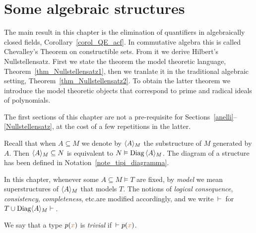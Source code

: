 \chapter{Some algebraic structures}
\label{algebraic}

\def\medrel#1{\parbox[b]{6ex}{\hfil$#1$}}
\def\ceq#1#2#3{\parbox[b]{25ex}{$\displaystyle #1$}\medrel{#2}$\displaystyle #3$}

The main result in this chapter is the elimination of quantifiers in algebraically closed fields, Corollary~\ref{corol_QE_acf}.
In commutative algebra this is called Chevalley's Theorem on constructible sets.
%
From it we derive Hilbert's Nullstellensatz.
First we state the theorem the model theoretic language, Theorem~\ref{thm_Nullstellensatz1}, then we tranlate it in the traditional algebraic setting, Theorem~\ref{thm_Nullstellensatz2}.
%
To obtain the latter theorem we introduce the model theoretic objects that correspond to prime and radical ideals of polynomials.


The first sections of this chapter are not a pre-requisite for Sections~\ref{anelli}\kern1.5pt--\kern1pt\ref{Nullstellensatz}, at the cost of a few repetitions in the latter.

\begin{notation}\label{notation1}
Recall that when $A\subseteq M$ we denote by \emph{$\langle A\rangle_M$\/} the substructure of $M$ generated by $A$.
%
Then $\langle A\rangle_M\subseteq N$ is equivalent to $N\vDash {\rm Diag}\,\langle A\rangle_M$.
%
The diagram of a structure has been defined in Notation~\ref{note_tipi_diagramma}.

In this chapter, whenever some $A\subseteq M\models T$ are fixed, by \textit{model\/} we mean superstructures of $\langle A\rangle_M$ that models $T$.
%
The notions of \textit{logical consequence}, \textit{consistency}, \textit{completeness}, etc.\@ are modified accordingly, and we write $\,\vdash\,$ for $T\cup{\rm Diag}\langle A\rangle_M\vdash\,$.

We say that a type $p({\color{brown} x})$ is \emph{trivial\/} if $\,\vdash p({\color{brown} x})$.
\end{notation}

